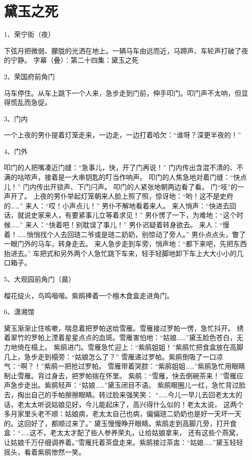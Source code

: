 \section*{黛玉之死}

1、荣宁街（夜）\par
下弦月把微弱、朦胧的光洒在地上。一辆马车由远而近，马蹄声、车轮声打破了夜的宁静。 
字幕（叠）：第二十四集：黛玉之死 

2、荣国府前角门\par
马车停住。从车上跳下一个人来，急步走到门前，伸手叩门。叩门声不太响，但显得慌乱而急促。 

3、门内\par
一个上夜的男仆提着灯笼走来，一边走，一边打着哈欠：“谁呀？深更半夜的！” 

4、门外\par
叩门的人把嘴凑近门缝：“急事儿，快，开了门再说！” 
门内传出含混不清的、不满的咕哝声，接着是一大串钥匙的叮当作响声。 叩门的人焦急地对着门缝：“快点儿！” 
门内传出开锁声、下门闩声。 叩门的人紧张地朝两边看了看。 
门“吱”的一声开了。 上夜的男仆举起灯笼朝来人脸上照了照，惊讶地：“哟！这不是史府的……” 
来人：“哎！小声点儿！” 男仆不解地看着来人。 
来人悄声：“快进去回话，就说史家来人，有要紧事儿立等着求见！” 
男仆愣了一下，为难地：“这个时候……” 来人：“快着吧！别耽误了事儿！” 
男仆迟疑着转身欲去。 来人：“慢着！……悄悄找个人去回琏二爷或是琏二奶奶，别惊动了旁人。” 
男仆点点头，瞥了一眼门外的马车，转身走去。 来人急步走到车旁，悄声地：“都下来吧，先把东西抬进去。” 
车把式和另外两个人急忙跳下车来，轻手轻脚地卸下车上大大小小的几口箱子。 

5、大观园前角门（晨）\par
榴花绽火，鸟鸣喈喈。紫鹃捧着一个檀木食盒走进角门。 

6、潇湘馆\par
黛玉渐渐止住咳嗽，喘息着把罗帕送给雪雁。雪雁接过罗帕一愣，急忙抖开。 
绣着翠竹的罗帕上湮着星星点点的血斑。雪雁害怕地：“姑娘……”黛玉脸色苍白，无力地倚在榻上。 
紫鹃进门。雪雁急忙迎上：“紫鹃姐姐！”紫鹃忙把食盒放在高脚几上，急步走到榻旁：“姑娘怎么了？” 
雪雁递过罗帕。紫鹃倒吸了一口凉气：“啊？！”紫鹃一把抢过罗帕。 
雪雁带着哭腔：“紫鹃姐姐……”紫鹃急忙用眼睛制止雪雁。背过身去，把罗帕揣在怀里。 
紫鹃：“雪雁，快去倒碗茶来！”雪雁应声急步走出。紫鹃轻声：“姑娘……”黛玉闭目不语。
紫鹃眼圈儿一红，急忙背过脸去，掏出自己的手帕擦擦眼睛。转过脸来强笑笑：
“……今儿一早儿去回老太太的话，老太太听说姑娘见好，今儿能起床了，高兴得什么似的！老太太说，
这两个多月家里头老不顺：姑娘病，老太太自己也病，偏偏琏二奶奶也是好一天坏一天的。这回好了，都顺过来了。”
黛玉慢慢睁开眼睛。紫鹃走到高脚几旁，打开食盒：“……这不，老太太才配了些人参养荣丸，让给姑娘拿来，
还有这些个燕窝，让姑娘千万仔细调养着。”雪雁托着茶盘走来。紫鹃接过茶盅：“姑娘……”黛玉轻轻摇头，看着紫鹃惨然一笑。 

